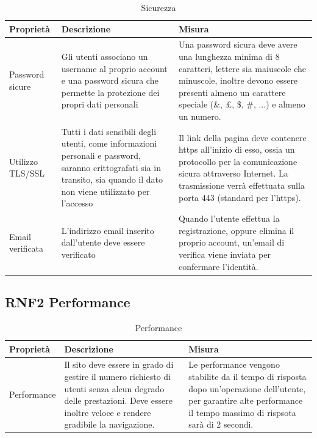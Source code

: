 \documentclass[a4paper,12pt]{article}
\begin{document}
\begin{table}[H]
    \centering
    \begin{tabular}{|p{}|p{}|p{}|}
        \hline  
         Proprietà & Descrizione & Misura\\
         \hline      
         
         Password sicure&  Gli utenti associano un username al proprio account e una password sicura che permette la protezione dei propri dati personali& Una password sicura deve avere una lunghezza minima di 8 caratteri, lettere sia maiuscole che minuscole, inoltre devono essere presenti almeno un carattere speciale (\&, £, \$, \#, ...) e almeno un numero.\\ \hline
        Utilizzo TLS/SSL & Tutti i dati sensibili degli utenti, come informazioni personali e password, saranno crittografati sia in transito, sia quando il dato non viene utilizzato
        per l’accesso & Il link della pagina deve contenere https all'inizio di esso, ossia un protocollo per la comunicazione sicura attraverso Internet. La trasmissione verrà effettuata sulla porta 443 (standard per l'https). \\  \hline
        Email verificata & L’indirizzo email inserito dall’utente deve essere verificato &
        Quando l'utente effettua la registrazione, oppure elimina il proprio account, un'email di verifica viene inviata per confermare l'identità.
        \\ \hline
    \end{tabular}
    \caption{Sicurezza}
\end{table}

\subsection*{RNF2 Performance}

\begin{table}[H]
    \centering
    \begin{tabular}{|>{\centering}p{}|p{}|p{}|}
        \hline  
         Proprietà & Descrizione & Misura\\
         \hline      
         Performance  
         &Il sito deve essere in grado di gestire il numero richiesto di utenti senza alcun degrado delle prestazioni. Deve essere inoltre veloce e rendere gradibile la navigazione.
         &  Le performance vengono stabilite da il tempo di risposta dopo un’operazione dell’utente, per garantire alte performance il tempo massimo di rispsota sarà di 2 secondi.\\ \hline
    \end{tabular}
    \caption{Performance}
    
\end{table}
\end{document}
